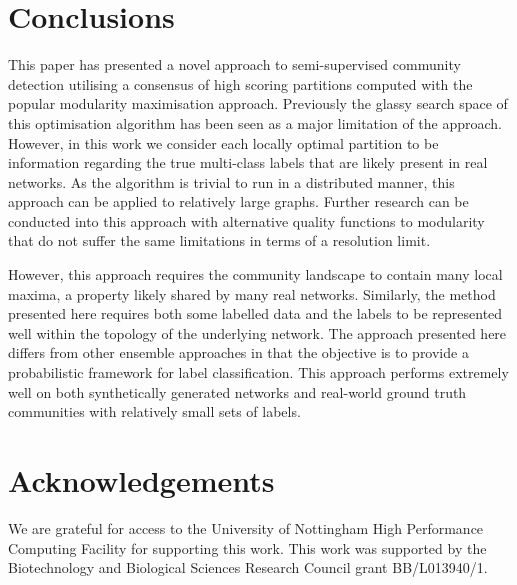 \documentclass[manuscript, proceedings]{acmart}
\begin{document}
\section{Conclusions}
This paper has presented a novel approach to semi-supervised community detection utilising a consensus of high scoring partitions computed with the popular modularity maximisation approach.
Previously the glassy search space of this optimisation algorithm has been seen as a major limitation of the approach.
However, in this work we consider each locally optimal partition to be information regarding the true multi-class labels that are likely present in real networks.
As the algorithm is trivial to run in a distributed manner, this approach can be applied to relatively large graphs.
Further research can be conducted into this approach with alternative quality functions to modularity that do not suffer the same limitations in terms of a resolution limit.

However, this approach requires the community landscape to contain many local maxima, a property likely shared by many real networks.
Similarly, the method presented here requires both some labelled data and the labels to be represented well within the topology of the underlying network.
The approach presented here differs from other ensemble approaches in that the objective is to provide a probabilistic framework for label classification.
This approach performs extremely well on both synthetically generated networks and real-world ground truth communities with relatively small sets of labels.


\section*{Acknowledgements}
We are grateful for access to the University of Nottingham High Performance Computing Facility for supporting this work.
This work was supported by the Biotechnology and Biological Sciences Research Council grant BB/L013940/1.

 


\end{document}
